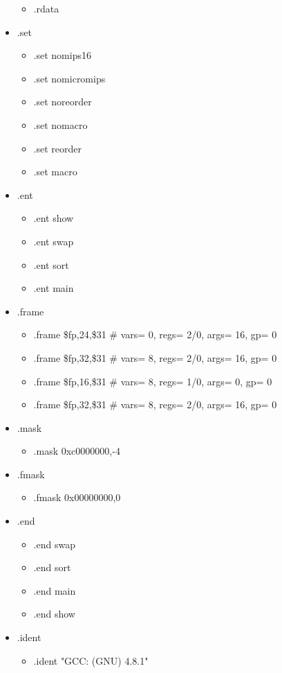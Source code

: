 \documentclass[12pt]{article}
\begin{document}
\begin{itemize}
\begin{itemize}
  \item .rdata
  \end{itemize}
\item .set\\
  \begin{itemize}
  \item .set nomips16
  \item .set nomicromips
  \item .set noreorder
  \item .set nomacro
  \item .set reorder
  \item .set macro
  \end{itemize}
\item .ent\\
  \begin{itemize}
  \item .ent show
  \item .ent swap
  \item .ent sort
  \item .ent main
  \end{itemize}
\item .frame\\
  \begin{itemize}
  \item .frame \$fp,24,\$31 \# vars= 0, regs= 2/0, args= 16, gp= 0
  \item .frame \$fp,32,\$31 \# vars= 8, regs= 2/0, args= 16, gp= 0
  \item .frame \$fp,16,\$31 \# vars= 8, regs= 1/0, args= 0, gp= 0
  \item .frame \$fp,32,\$31 \# vars= 8, regs= 2/0, args= 16, gp= 0
  \end{itemize}
\item .mask\\
  \begin{itemize}
  \item .mask	0xc0000000,-4
  \end{itemize}
\item .fmask\\
  \begin{itemize}
  \item .fmask	0x00000000,0
  \end{itemize}
\item .end\\
  \begin{itemize}
  \item .end swap
  \item .end sort
  \item .end main
  \item .end show
  \end{itemize}
\item .ident\\
  \begin{itemize}
  \item .ident "GCC: (GNU) 4.8.1"
  \end{itemize}
\end{itemize}
\end{document}
